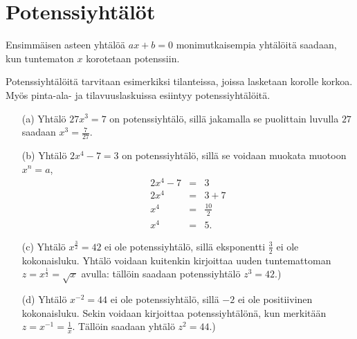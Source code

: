 \chapter{Potenssiyhtälöt}

Ensimmäisen asteen yhtälöä $ax+b = 0$ monimutkaisempia yhtälöitä saadaan,
kun tuntematon $x$ korotetaan potenssiin.


Potenssiyhtälöitä tarvitaan esimerkiksi tilanteissa, joissa lasketaan
korolle korkoa. Myös pinta-ala- ja tilavuuslaskuissa esiintyy potenssiyhtälöitä.

\begin{esimerkki}
\begin{enumerate}
\item[(a)]
Yhtälö $27x^3=7$ on potenssiyhtälö, sillä jakamalla se
puolittain luvulla $27$ saadaan $x^3 = \frac{7}{27}$.
\item[(b)]
Yhtälö $2x^{4}-7=3$ on potenssiyhtälö, sillä se voidaan muokata
muotoon $x^n = a$,
\begin{eqnarray*}
2x^{4} -7 &=& 3 \\
2x^{4} &=& 3+7 \\
x^{4} &=& \frac{10}{2} \\
x^{4} &=& 5.
\end{eqnarray*}
\item[(c)]
Yhtälö $x^{\frac{3}{2}}=42$ ei ole potenssiyhtälö, sillä eksponentti
$\frac{3}{2}$ ei ole kokonaisluku. Yhtälö voidaan kuitenkin kirjoittaa
uuden tuntemattoman $z=x^{\frac{1}{2}}=\sqrt{x}$ avulla: tällöin
saadaan potenssiyhtälö $z^3 = 42$.)
\item[(d)]
Yhtälö $x^{-2}=44$ ei ole potenssiyhtälö, sillä $-2$ ei ole positiivinen kokonaisluku. Sekin voidaan kirjoittaa potenssiyhtälönä, kun merkitään
$z=x^{-1}=\frac{1}{x}$. Tällöin saadaan yhtälö $z^2 = 44$.)
\end{enumerate}
\end{esimerkki}


